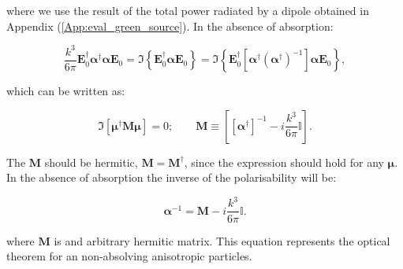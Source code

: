 where we use the result of the total power radiated by a dipole obtained in Appendix (\ref{App:eval_green_source}). In the absence of absorption:

\begin{equation}
\frac{k^3}{6\pi}\mathbf{E}_{0}^{\dagger}\boldsymbol{\alpha}^{\dagger}\boldsymbol{\alpha}\mathbf{E}_{0} = \Im\left\{\mathbf{E}_{0}^{\dagger}\boldsymbol{\alpha}\mathbf{E}_{0}\right\} = \Im\left\{\mathbf{E}_{0}^{\dagger}\left[\boldsymbol{\alpha}^{\dagger}\left(\boldsymbol{\alpha}^{\dagger}\right)^{-1}\right]\boldsymbol{\alpha}\mathbf{E}_{0}\right\},
\end{equation}

which can be written as:

\begin{equation}
\Im\left[\boldsymbol{\mu}^{\dagger}\mathbf{M}\boldsymbol{\mu}\right]= 0;\qquad \mathbf{M}\equiv\left[\left[\boldsymbol{\alpha}^{\dagger}\right]^{-1}-i\frac{k^3}{6\pi}\mathbb{I}\right].
\end{equation}


The $\mathbf{M}$ should be hermitic, $\mathbf{M}=\mathbf{M}^{\dagger}$, since the expression should hold for any $\boldsymbol{\mu}$. In the absence of absorption the inverse of the polarisability will be:

\begin{equation}
\boldsymbol{\alpha}^{-1} = \mathbf{M} -i\frac{k^3}{6\pi}\mathbb{I}.
\end{equation}

where $\mathbf{M}$ is and arbitrary hermitic matrix. This equation represents the optical theorem for an non-absolving anisotropic particles.